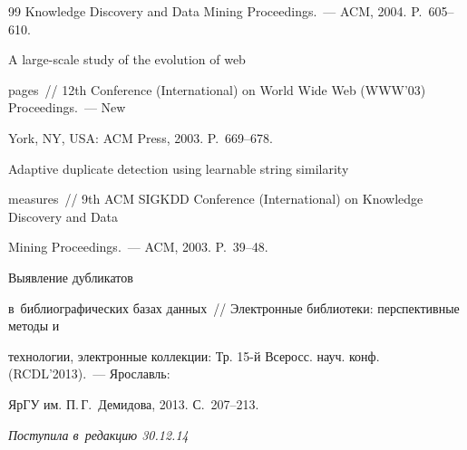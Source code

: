 {{\begin{thebibliography}{99}
Knowledge Discovery and Data Mining Proceedings.~--- ACM, 2004. P.~605--610.


 A large-scale study of the evolution of web

pages~/\!\!/ 12th Conference (International) on World Wide Web (WWW'03) Proceedings.~--- New

York, NY, USA: ACM Press, 2003. P.~669--678.




 Adaptive duplicate detection using learnable string similarity

measures~/\!\!/ 9th ACM SIGKDD Conference (International) on Knowledge Discovery and Data

Mining Proceedings.~--- ACM, 2003. P.~39--48.


 Выявление дубликатов

в~биб\-лио\-графических базах данных~/\!\!/ Электронные библиотеки: перспективные методы и

технологии, электронные коллекции: Тр. 15-й Всеросс. науч. конф. (RCDL'2013).~--- Ярославль:

ЯрГУ им. П.\,Г.~Демидова, 2013. С.~207--213.

\end{thebibliography}

} }








\hfill{\small\textit{Поступила в~редакцию 30.12.14}}


























